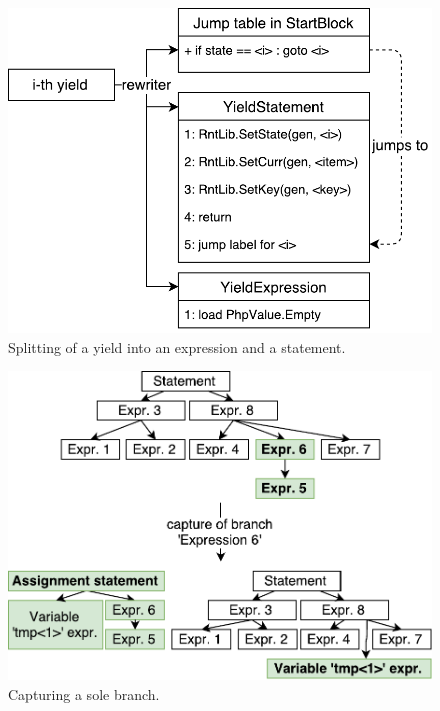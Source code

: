 \begin{figure}[h]
	\centering	
	\includegraphics[scale=0.75]{../img/5_2_yieldSplitting}	
	\caption{Splitting of a yield into an expression and a statement.}
	\label{fig5.2:Splitting}
\end{figure}

\begin{figure}[h]
	\centering	
	\includegraphics[scale=0.75]{../img/5_2_capturing}	
	\caption{Capturing a sole branch.}
	\label{fig5.2:CaptureBranch}
\end{figure}

